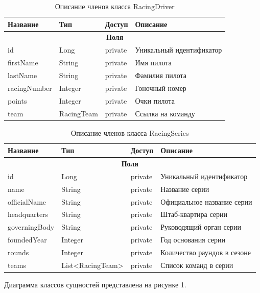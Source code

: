 \documentclass[oneside,a4paper,14pt]{extarticle}
\begin{document}
\begin{table}[H]
\centering
\caption{Описание членов класса RacingDriver}
\begin{tabular}{|p{4.5cm}|p{3.5cm}|p{2cm}|p{5cm}|}
\hline
\textbf{Название} & \textbf{Тип} & \textbf{Доступ} & \textbf{Описание} \\ \hline
\multicolumn{4}{|c|}{\textbf{Поля}} \\ \hline
id & Long & private & Уникальный идентификатор \\ \hline
firstName & String & private & Имя пилота \\ \hline
lastName & String & private & Фамилия пилота \\ \hline
racingNumber & Integer & private & Гоночный номер \\ \hline
points & Integer & private & Очки пилота \\ \hline
team & RacingTeam & private & Ссылка на команду \\ \hline
\end{tabular}
\end{table}

\begin{table}[H]
\centering
\caption{Описание членов класса RacingSeries}
\begin{tabular}{|p{4.5cm}|p{3.5cm}|p{2cm}|p{5cm}|}
\hline
\textbf{Название} & \textbf{Тип} & \textbf{Доступ} & \textbf{Описание} \\ \hline
\multicolumn{4}{|c|}{\textbf{Поля}} \\ \hline
id & Long & private & Уникальный идентификатор \\ \hline
name & String & private & Название серии \\ \hline
officialName & String & private & Официальное название серии \\ \hline
headquarters & String & private & Штаб-квартира серии \\ \hline
governingBody & String & private & Руководящий орган серии \\ \hline
foundedYear & Integer & private & Год основания серии \\ \hline
rounds & Integer & private & Количество раундов в сезоне \\ \hline
teams & List<RacingTeam> & private & Список команд в серии \\ \hline
\end{tabular}
\end{table}

Диаграмма классов сущностей представлена на рисунке 1.
\end{document}
